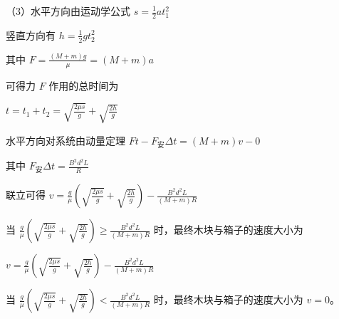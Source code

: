 \documentclass[\gkver]{gaokaozhenti}
\begin{document}
\begin{enumerate}
{（3）水平方向由运动学公式 $s = \frac{1}{2}at_{1}^{2}$

竖直方向有 $h = \frac{1}{2}gt_{2}^{2}$

其中 $F = \frac{(M + m)g}{\mu} = (M + m)a$

可得力 $F$ 作用的总时间为

$t = t_{1} + t_{2} = \sqrt{\frac{2\mu s}{g}} + \sqrt{\frac{2h}{g}}$

水平方向对系统由动量定理 $Ft - F_{\text{安}}\Delta t = (M + m)v - 0$

其中 $F_{\text{安}}\Delta t = \frac{B^{2}d^{2}L}{R}$

联立可得 $v = \frac{g}{\mu}\left(\sqrt{\frac{2\mu s}{g}} + \sqrt{\frac{2h}{g}}\right) - \frac{B^{2}d^{2}L}{(M + m)R}$

当 $\frac{g}{\mu}\left(\sqrt{\frac{2\mu s}{g}} + \sqrt{\frac{2h}{g}}\right) \geq \frac{B^{2}d^{2}L}{(M + m)R}$ 时，最终木块与箱子的速度大小为

$v = \frac{g}{\mu}\left(\sqrt{\frac{2\mu s}{g}} + \sqrt{\frac{2h}{g}}\right) - \frac{B^{2}d^{2}L}{(M + m)R}$

当 $\frac{g}{\mu}\left(\sqrt{\frac{2\mu s}{g}} + \sqrt{\frac{2h}{g}}\right) < \frac{B^{2}d^{2}L}{(M + m)R}$ 时，最终木块与箱子的速度大小为 $v = 0$。
}

\end{enumerate}
\end{document}
